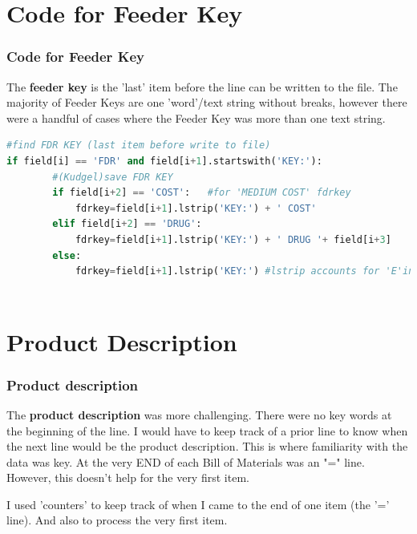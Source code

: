 \documentclass{beamer}\usepackage[]{graphicx}\usepackage[]{color}
\begin{document}
\section{Code for Feeder Key}
\begin{frame}[fragile]
  \frametitle{Code for Feeder Key}
The \textbf{feeder key} is the 'last' item before the line can be written to the file.  The majority of Feeder Keys are one 'word'/text string without breaks, however there were a handful of cases where the Feeder Key was more than one text string.

\begin{lstlisting}[language=Python]
    #find FDR KEY (last item before write to file)
if field[i] == 'FDR' and field[i+1].startswith('KEY:'):
        #(Kudgel)save FDR KEY
        if field[i+2] == 'COST':   #for 'MEDIUM COST' fdrkey
            fdrkey=field[i+1].lstrip('KEY:') + ' COST'
        elif field[i+2] == 'DRUG':
            fdrkey=field[i+1].lstrip('KEY:') + ' DRUG '+ field[i+3]
        else:
            fdrkey=field[i+1].lstrip('KEY:') #lstrip accounts for 'E'in fdrkey
      
\end{lstlisting}
   
\end{frame}


\section{Product Description}
\begin{frame}[fragile]
  \frametitle{Product description}
The \textbf{product description} was more challenging.  There were no key words at the beginning of the line.  I would have to keep track of a prior line to know when the next line would be the product description.  This is where familiarity with the data was key.  At the very END of each Bill of Materials was an "=" line.  However, this doesn't help for the very first item.

I used 'counters' to keep track of when I came to the end of one item (the '=' line).  And also to process the very first item.


\end{frame}
\end{document}
